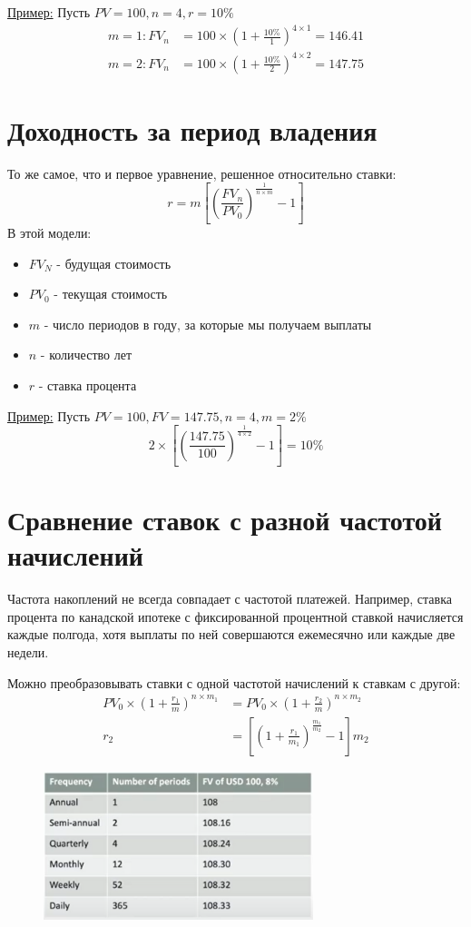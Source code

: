 \documentclass{article}
\begin{document}
\underline{Пример:} Пусть $PV = 100, n = 4, r = 10\%$
\begin{align*}
    m = 1: FV_n &= 100 \times (1 + \frac{10\%}{1})^{4\times 1} = 146.41
    \\
    m=2: FV_n &= 100\times (1+\frac{10\%}{2})^{4\times 2} = 147.75
\end{align*}

\section{Доходность за период владения}
То же самое, что и первое уравнение, решенное относительно ставки:
\begin{equation*}
    r = m[(\frac{FV_n}{PV_0})^\frac{1}{n\times m} - 1]
\end{equation*}
В этой модели:
\begin{itemize}
    \item $FV_N$ - будущая стоимость
    \item $PV_0$ - текущая стоимость
    \item $m$ - число периодов в году, за которые мы получаем выплаты
    \item $n$ - количество лет
    \item $r$ - ставка процента
\end{itemize}
\underline{Пример:} Пусть $PV = 100, FV = 147.75, n = 4, m = 2\%$
\begin{equation*}
    2\times[(\frac{147.75}{100})^\frac{1}{4\times 2} - 1] = 10\%
\end{equation*}

\section{Сравнение ставок с разной частотой начислений}
Частота накоплений не всегда совпадает с частотой платежей. Например, ставка процента по канадской ипотеке с фиксированной процентной ставкой начисляется каждые полгода, хотя выплаты по ней совершаются ежемесячно или каждые две недели.

Можно преобразовывать ставки с одной частотой начислений к ставкам с другой:
\begin{align*}
    PV_0\times(1+\frac{r_1}{m})^{n\times m_1} &= PV_0\times(1+\frac{r_2}{m})^{n\times m_2}
    \\
    r_2 &= [(1 + \frac{r_1}{m_1})^\frac{m_1}{m_2} - 1]m_2
\end{align*}
\begin{figure}[h]
\centering
\includegraphics[width=0.7\textwidth]{1.png}
\label{loadings}
\end{figure}
\end{document}
